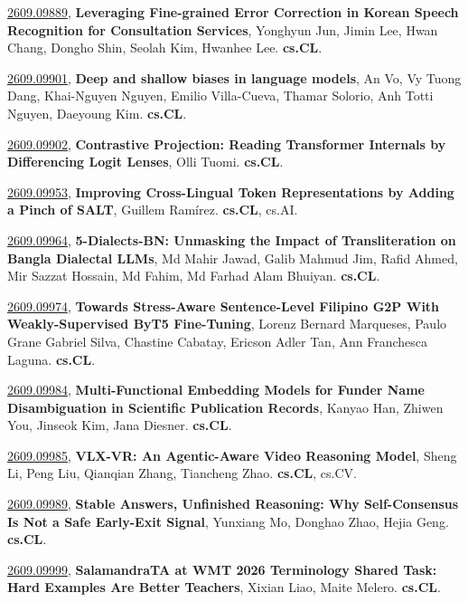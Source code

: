 \documentclass[9pt, a4paper]{article}
\theoremstyle{plain}
\theoremstyle{definition}
\theoremstyle{remark}
\newcommand{\arxivwithtarget}[3]{\hypertarget{#1}{}\href{https://arxiv.org/abs/#1}{#1}, \textbf{\textcolor{arxivblue}{#2}}, #3. }
\begin{document}
\arxivwithtarget{2609.09889}{Leveraging Fine-grained Error Correction in Korean Speech Recognition for Consultation Services}{Yonghyun Jun, Jimin Lee, Hwan Chang, Dongho Shin, Seolah Kim, Hwanhee Lee}\textbf{cs.CL}.



\arxivwithtarget{2609.09901}{Deep and shallow biases in language models}{An Vo, Vy Tuong Dang, Khai-Nguyen Nguyen, Emilio Villa-Cueva, Thamar Solorio, Anh Totti Nguyen, Daeyoung Kim}\textbf{cs.CL}.



\arxivwithtarget{2609.09902}{Contrastive Projection: Reading Transformer Internals by Differencing Logit Lenses}{Olli Tuomi}\textbf{cs.CL}.



\arxivwithtarget{2609.09953}{Improving Cross-Lingual Token Representations by Adding a Pinch of SALT}{Guillem Ramírez}\textbf{cs.CL}, cs.AI.



\arxivwithtarget{2609.09964}{5-Dialects-BN: Unmasking the Impact of Transliteration on Bangla Dialectal LLMs}{Md Mahir Jawad, Galib Mahmud Jim, Rafid Ahmed, Mir Sazzat Hossain, Md Fahim, Md Farhad Alam Bhuiyan}\textbf{cs.CL}.



\arxivwithtarget{2609.09974}{Towards Stress-Aware Sentence-Level Filipino G2P With Weakly-Supervised ByT5 Fine-Tuning}{Lorenz Bernard Marqueses, Paulo Grane Gabriel Silva, Chastine Cabatay, Ericson Adler Tan, Ann Franchesca Laguna}\textbf{cs.CL}.



\arxivwithtarget{2609.09984}{Multi-Functional Embedding Models for Funder Name Disambiguation in Scientific Publication Records}{Kanyao Han, Zhiwen You, Jinseok Kim, Jana Diesner}\textbf{cs.CL}.



\arxivwithtarget{2609.09985}{VLX-VR: An Agentic-Aware Video Reasoning Model}{Sheng Li, Peng Liu, Qianqian Zhang, Tiancheng Zhao}\textbf{cs.CL}, cs.CV.



\arxivwithtarget{2609.09989}{Stable Answers, Unfinished Reasoning: Why Self-Consensus Is Not a Safe Early-Exit Signal}{Yunxiang Mo, Donghao Zhao, Hejia Geng}\textbf{cs.CL}.



\arxivwithtarget{2609.09999}{SalamandraTA at WMT 2026 Terminology Shared Task: Hard Examples Are Better Teachers}{Xixian Liao, Maite Melero}\textbf{cs.CL}.
\end{document}
